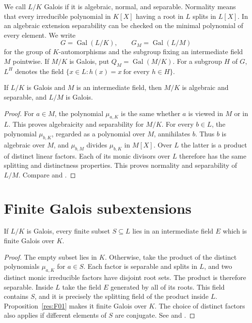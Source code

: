 We call \(L/K\) Galois if it is algebraic, normal, and separable.
Normality means that every irreducible polynomial in \(K[X]\) having
a root in \(L\) splits in \(L[X]\). In an algebraic extension separability
can be checked on the minimal polynomial of every element. We write
\[
 G=\operatorname{Gal}(L/K),\qquad G_M=\operatorname{Gal}(L/M)
\]
for the group of \(K\)-automorphisms and the subgroup fixing an
intermediate field \(M\) pointwise. If \(M/K\) is Galois, put
\(Q_M=\operatorname{Gal}(M/K)\). For a subgroup \(H\) of \(G\), \(L^H\)
denotes the field \(\{x\in L:h(x)=x\ \text{for every }h\in H\}\).

\begin{proposition}\label{res:F02}
If \(L/K\) is Galois and \(M\) is an intermediate field, then \(M/K\)
is algebraic and separable, and \(L/M\) is Galois.
\end{proposition}
\begin{proof}
For \(a\in M\), the polynomial \(\mu_{a,K}\) is the same whether \(a\)
is viewed in \(M\) or in \(L\). This proves algebraicity and separability
for \(M/K\). For every \(b\in L\), the polynomial \(\mu_{b,K}\),
regarded as a polynomial over \(M\), annihilates \(b\). Thus \(b\)
is algebraic over \(M\), and \(\mu_{b,M}\) divides \(\mu_{b,K}\) in
\(M[X]\). Over \(L\) the latter is a product of distinct linear factors.
Each of its monic divisors over \(L\) therefore has the same splitting
and distinctness properties. This proves normality and separability
of \(L/M\). Compare \cite[Proposition 7.3]{milne} and
\cite[Tag 09I2]{stacks}.
\end{proof}

\section{Finite Galois subextensions}

\begin{proposition}
\label{res:F03}
If \(L/K\) is Galois, every finite subset \(S\subseteq L\) lies in an
intermediate field \(E\) which is finite Galois over \(K\).
\end{proposition}
\begin{proof}
The empty subset lies in \(K\). Otherwise, take the product of the
distinct polynomials \(\mu_{a,K}\) for \(a\in S\). Each factor is
separable and splits in \(L\), and two distinct monic irreducible
factors have disjoint root sets. The product is therefore separable.
Inside \(L\) take the field \(E\) generated by all of its roots.
This field contains \(S\), and it is precisely the splitting field
of the product inside \(L\). Proposition~\ref{res:F01} makes it finite
Galois over \(K\). The choice of distinct factors also applies if
different elements of \(S\) are conjugate. See \cite[Chapter 7, p.~95]{milne}
and \cite[Tag 0BMG]{stacks}.
\end{proof}

